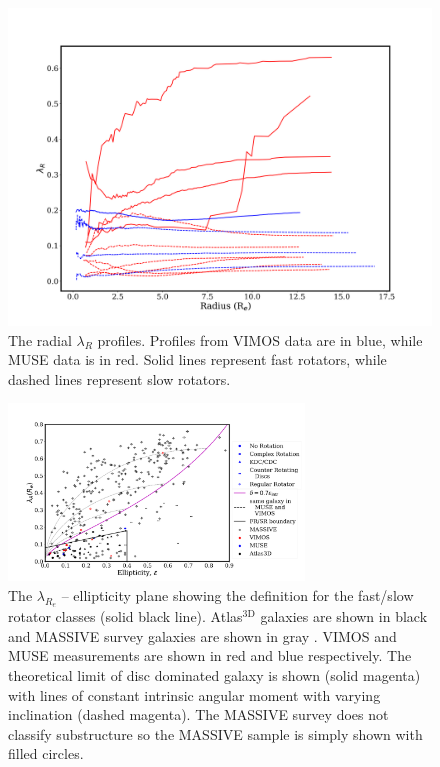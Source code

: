 		\begin{figure}
			\centering
			\includegraphics[width=.7\textwidth]{chapter4/lambda_R.png}
			\caption[$\lambda_{R}$ radial profiles]{The radial $\lambda_{R}$ profiles. Profiles from VIMOS data are in blue, while MUSE data is in red. Solid lines represent fast rotators, while dashed lines represent slow rotators.}
			\label{fig:lambdaR_profile}
		\end{figure}


		\begin{figure}
			\centering
			\includegraphics[width=0.7\textwidth]{chapter4/lambda_R_ellipticity.png}
			\caption[$\lambda_{R_e}$ -- ellipticity plane]{The $\lambda_{R_e}$ -- ellipticity plane showing the definition for the fast/slow rotator classes (solid black line). Atlas$^\text{3D}$ galaxies are shown in black \citep{Emsellem2011} and MASSIVE survey galaxies are shown in gray \citep{Veale2017}. VIMOS and MUSE measurements are shown in red and blue respectively. The theoretical limit of disc dominated galaxy is shown (solid magenta) with lines of constant intrinsic angular moment with varying inclination (dashed magenta). The MASSIVE survey does not classify substructure so the MASSIVE sample is simply shown with filled circles.}
			\label{fig:lambdaR_ellip}
		\end{figure}


